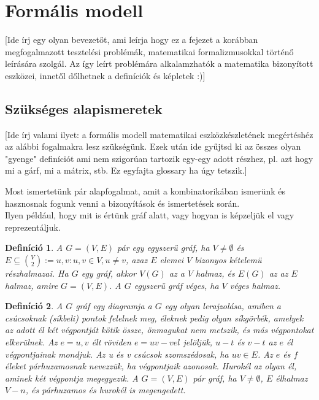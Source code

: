 \documentclass[12pt]{article}
\newtheorem{defin}{Definíció}[section]
\begin{document}
\section{Formális modell}
[Ide írj egy olyan bevezetőt, ami leírja hogy ez a fejezet a korábban megfogalmazott tesztelési problémák, matematikai formalizmusokkal történő leírására szolgál. Az így leírt problémára alkalamzhatók a matematika bizonyított eszközei, innetől dőlhetnek a definíciók és képletek :)]

\subsection{Szükséges alapismeretek}
[Ide írj valami ilyet: a formális modell matematikai eszközkészletének megértéshéz az alábbi fogalmakra lesz szükségünk. Ezek után ide gyűjtsd ki az összes olyan "gyenge" definíciót ami nem szigorúan tartozik egy-egy adott részhez, pl. azt hogy mi a gárf, mi a mátrix, stb. Ez egyfajta glossary ha úgy tetszik.]

Most ismertetünk pár alapfogalmat, amit a kombinatorikában ismerünk és hasznosnak fogunk venni a bizonyítások és ismertetések során.\\

Ilyen például, hogy mit is értünk gráf alatt, vagy hogyan is képzeljük el vagy reprezentáljuk.

\begin{defin}
A $G = (V,E)$ pár egy egyszerü gráf, ha $V \neq \emptyset$ és $E \subseteq \binom{V}{2} := {{u,v} : u,v \in V, u \neq v}$, azaz $E$ elemei $V$ bizonyos kételemü részhalmazai. Ha $G$ egy gráf, akkor $V(G)$ az a $V$ halmaz, és $E(G)$ az az $E$ halmaz, amire $G = (V,E)$. A $G$ egyszerü gráf véges, ha $V$ véges halmaz. ~\cite{szam:Fleiner}
\end{defin}

\begin{defin}
A $G$ gráf egy diagramja a $G$ egy olyan lerajzolása, amiben a csúcsoknak (síkbeli) pontok felelnek meg, éleknek pedig olyan síkgörbék, amelyek az adott él két végpontját kötik össze, önmagukat nem metszik, és más végpontokat elkerülnek. Az $e = {u, v}$ élt röviden $e = uv-vel$ jelöljük, $u-t$ és $v-t$ az $e$ él végpontjainak mondjuk. Az u és v csúcsok szomszédosak, ha $uv \in E$. Az $e$ és $f$ éleket párhuzamosnak nevezzük, ha végpontjaik azonosak. Hurokél az olyan él, aminek két végpontja megegyezik. A $G = (V,E)$ pár gráf, ha $V \neq \emptyset$, $E$ élhalmaz $V-n$, és párhuzamos és hurokél is megengedett. ~\cite{szam:Fleiner}
\end{defin}
\end{document}
